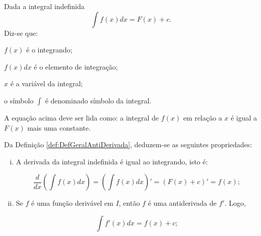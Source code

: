 \cleardoublepage\documentclass[../main.tex]{subfiles}
\begin{document}
 Dada a integral indefinida
\[ \int f(x)dx=F(x)+ c. \]
Diz-se que:
\begin{compactenum}[i.]
\item \(f(x)\) é o integrando;
\item \(f(x)dx\) é o elemento de integração;
\item \(x\) é a variável da integral;
\item o símbolo \(\int\) é denominado símbolo da integral.
\item A equação acima deve ser lida como: a integral de \(f(x)\) em relação a \(x\) é igual a \(F(x)\) mais uma constante.
\end{compactenum}\vspace{0.5cm}

 Da Definição \ref{def:DefGeralAntiDerivada}, deduzem-se as seguintes propriedades:
 \begin{enumerate}[i.]
\item A derivada da integral indefinida é igual ao integrando, isto é:

\[ \dfrac{d}{dx}\left( \int f(x)dx\right)=\left( \int f(x)dx\right)'=(F(x)+c)'=f(x); \]
\item Se \(f\) é uma função derivável em \(I\), então \(f\) é uma antiderivada de  \(f'\). Logo,

\[ \int f'(x)dx=f(x)+c; \]
\end{enumerate}
\end{document}
